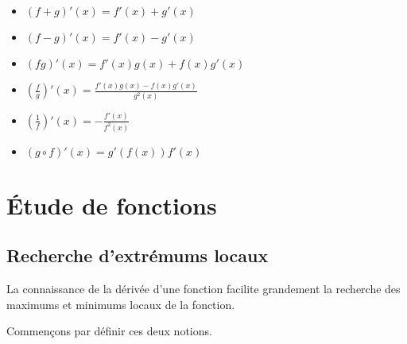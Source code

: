 \documentclass[main.tex]{subfiles}
\begin{document}
\begin{howto}
    
    \begin{itemize}
        \item $(f+g)'(x) = f'(x) + g'(x)$
        \item $(f-g)'(x) = f'(x) - g'(x)$
        \item $(fg)'(x) = f'(x) g(x) + f(x) g'(x)$
        \item $\left( \frac f g \right)'(x) = \frac{f'(x) g(x) - f(x) g'(x)}{g^2(x)}$
        \item $\left( \frac 1 f \right)'(x) = - \frac{f'(x)}{f^2(x)}$
        \item $(g \circ f)'(x) = g'(f(x)) f'(x)$
    \end{itemize}

\end{howto}

\section{Étude de fonctions}

\subsection{Recherche d'extrémums locaux}

La connaissance de la dérivée d'une fonction facilite grandement la recherche des maximums et minimums locaux de la fonction.

Commençons par définir ces deux notions.
\end{document}
